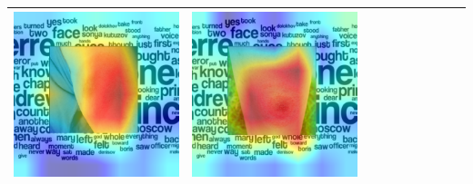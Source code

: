 \begin{landscape}
\begin{table}[]
\begin{tabular}{@{}c c c c c c c c c c@{}}
			\includegraphics[width=.12\textheight ,keepaspectratio]{images/pretraining/gradcam/3/ConvNextTinyCombinedGradCam.png} &
			\includegraphics[width=.12\textheight ,keepaspectratio]{images/pretraining/gradcam/9/ConvNextTinyCombinedGradCam.png} \\\bottomrule
		\end{tabular}
	\end{table}
\end{landscape}

